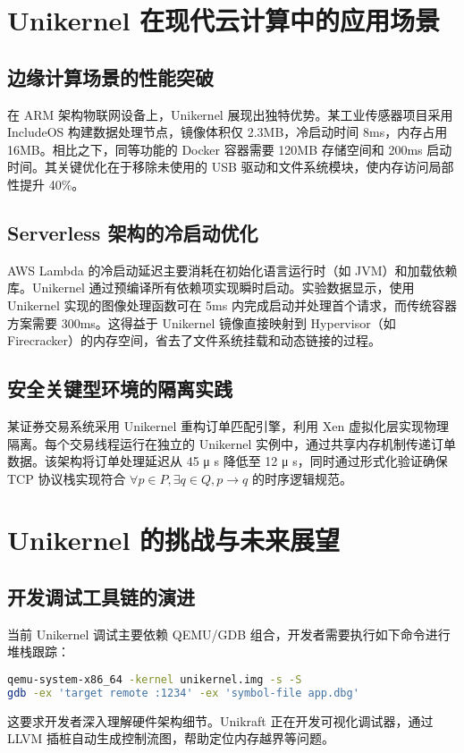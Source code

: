 \chapter{Unikernel 在现代云计算中的应用场景}
\section{边缘计算场景的性能突破}
在 ARM 架构物联网设备上，Unikernel 展现出独特优势。某工业传感器项目采用 IncludeOS 构建数据处理节点，镜像体积仅 2.3MB，冷启动时间 8ms，内存占用 16MB。相比之下，同等功能的 Docker 容器需要 120MB 存储空间和 200ms 启动时间。其关键优化在于移除未使用的 USB 驱动和文件系统模块，使内存访问局部性提升 40\%{}。\par
\section{Serverless 架构的冷启动优化}
AWS Lambda 的冷启动延迟主要消耗在初始化语言运行时（如 JVM）和加载依赖库。Unikernel 通过预编译所有依赖项实现瞬时启动。实验数据显示，使用 Unikernel 实现的图像处理函数可在 5ms 内完成启动并处理首个请求，而传统容器方案需要 300ms。这得益于 Unikernel 镜像直接映射到 Hypervisor（如 Firecracker）的内存空间，省去了文件系统挂载和动态链接的过程。\par
\section{安全关键型环境的隔离实践}
某证券交易系统采用 Unikernel 重构订单匹配引擎，利用 Xen 虚拟化层实现物理隔离。每个交易线程运行在独立的 Unikernel 实例中，通过共享内存机制传递订单数据。该架构将订单处理延迟从 45 μ s 降低至 12 μ s，同时通过形式化验证确保 TCP 协议栈实现符合 $\forall p \in P, \exists q \in Q, p \rightarrow q$ 的时序逻辑规范。\par
\chapter{Unikernel 的挑战与未来展望}
\section{开发调试工具链的演进}
当前 Unikernel 调试主要依赖 QEMU/GDB 组合，开发者需要执行如下命令进行堆栈跟踪：\par
\begin{lstlisting}[language=bash]
qemu-system-x86_64 -kernel unikernel.img -s -S
gdb -ex 'target remote :1234' -ex 'symbol-file app.dbg'
\end{lstlisting}
这要求开发者深入理解硬件架构细节。Unikraft 正在开发可视化调试器，通过 LLVM 插桩自动生成控制流图，帮助定位内存越界等问题。\par

